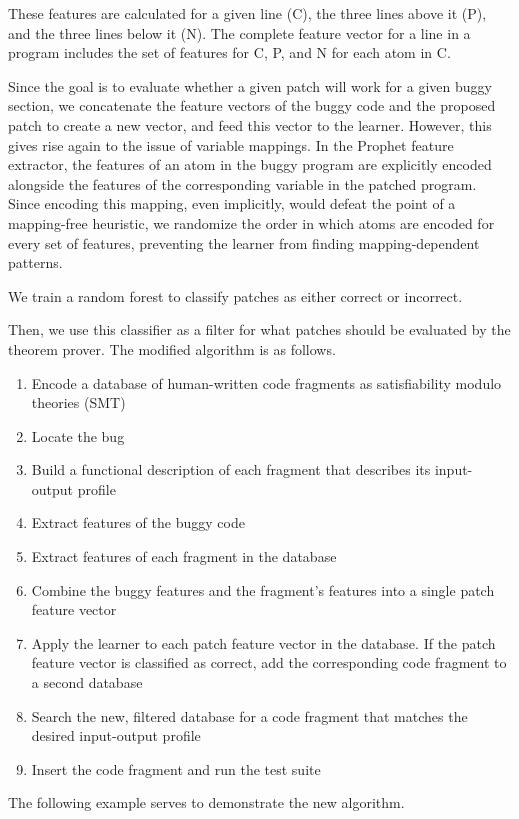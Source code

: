 \documentclass[conference]{IEEEtran}
\begin{document}
These features are calculated for a given line (C), the three lines above it (P), and the three lines below it (N). 
The complete feature vector for a line in a program includes the set of features for C, P, and N for each atom in C. 

Since the goal is to evaluate whether a given patch will work for a given buggy section, we concatenate the feature vectors of the buggy code and the proposed patch to create a new vector, and feed this vector to the learner. 
However, this gives rise again to the issue of variable mappings. 
In the Prophet feature extractor, the features of an atom in the buggy program are explicitly encoded alongside the features of the corresponding variable in the patched program. 
Since encoding this mapping, even implicitly, would defeat the point of a mapping-free heuristic, we randomize the order in which atoms are encoded for every set of features, preventing the learner from finding mapping-dependent patterns. 
 
We train a random forest to classify patches as either correct or incorrect. 

Then, we use this classifier as a filter for what patches should be evaluated by the theorem prover. 
The modified algorithm is as follows.
\begin{enumerate}
\item Encode a database of human-written code fragments as satisfiability modulo theories (SMT)
\item Locate the bug
\item Build a functional description of each fragment that describes its input-output profile
\item Extract features of the buggy code
\item Extract features of each fragment in the database
\item Combine the buggy features and the fragment's features into a single patch feature vector
\item Apply the learner to each patch feature vector in the database. If the patch feature vector is classified as correct, add the corresponding code fragment to a second database
\item Search the new, filtered database for a code fragment that matches the desired input-output profile
\item Insert the code fragment and run the test suite 
\end{enumerate}


The following example serves to demonstrate the new algorithm. 
\end{document}
